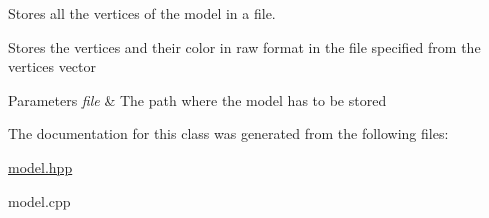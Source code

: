 Stores all the vertices of the model in a file. 

Stores the vertices and their color in raw format in the file specified from the vertices vector 
\begin{DoxyParams}{Parameters}
{\em file} & The path where the model has to be stored \\
\hline
\end{DoxyParams}


The documentation for this class was generated from the following files\+:\begin{DoxyCompactItemize}
\item 
\hyperlink{model_8hpp}{model.\+hpp}\item 
model.\+cpp\end{DoxyCompactItemize}
